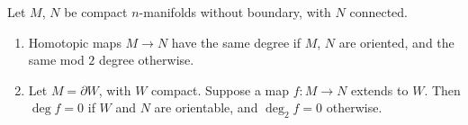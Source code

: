 Let $M$, $N$ be compact $n$-manifolds without boundary, with $N$ connected.

\begin{enumerate}
\item[(a)] Homotopic maps $M \to N$ have the same degree if $M$, $N$ are oriented, and the same mod $2$ degree otherwise.
\item[(b)] Let $M = \partial W$, with $W$ compact. Suppose a map $f \colon M \to N$ extends to $W$. Then $\deg f = 0$ if $W$ and $N$ are orientable, and $\deg_2 f = 0$ otherwise.
\end{enumerate}
